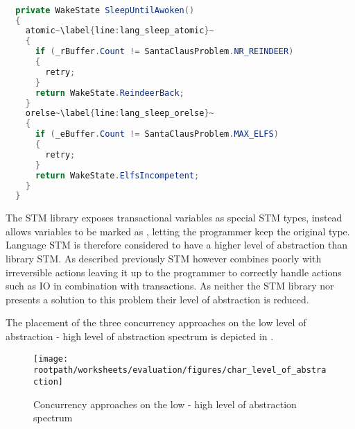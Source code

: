 \begin{lstlisting}[float,label=lst:lang_SleepUntilAwoken,
  caption={\bscode{SleepUntilAwoken} Method - \ac{STM} Language},
  language=Java,  
  showspaces=false,
  showtabs=false,
  breaklines=true,
  showstringspaces=false,
  breakatwhitespace=true,
  escapechar=~,
  commentstyle=\color{greencomments},
  keywordstyle=\color{bluekeywords},
  stringstyle=\color{redstrings},
  morekeywords={atomic, retry, orelse, var, get, set, ref, out}]  % Start your code-block

  private WakeState SleepUntilAwoken()
  {
    atomic~\label{line:lang_sleep_atomic}~
    {
      if (_rBuffer.Count != SantaClausProblem.NR_REINDEER)
      {
        retry;
      }
      return WakeState.ReindeerBack;
    }
    orelse~\label{line:lang_sleep_orelse}~
    {
      if (_eBuffer.Count != SantaClausProblem.MAX_ELFS)
      {
        retry;
      }
      return WakeState.ElfsIncompetent;
    }
  }
\end{lstlisting}

The \ac{STM} library exposes transactional variables as special \ac{STM} types, \stmnamesp instead allows variables to be marked as , letting the programmer keep the original type. Language \ac{STM} is therefore considered to have a higher level of abstraction than library \ac{STM}. As described previously \ac{STM} however combines poorly with irreversible actions leaving it up to the programmer to correctly handle actions such as \ac{IO} in combination with transactions. As neither the \ac{STM} library nor \stmnamesp presents a solution to this problem their level of abstraction is reduced.

The placement of the three concurrency approaches on the low level of abstraction - high level of abstraction spectrum is depicted in . 

\begin{figure}[htbp]
\centering
 \texttt{[image: \\rootpath/worksheets/evaluation/figures/char\_level\_of\_abstraction]} 
 \caption{Concurrency approaches on the low - high level of abstraction spectrum}
\label{fig:char_level_of_abstraction}
\end{figure}


